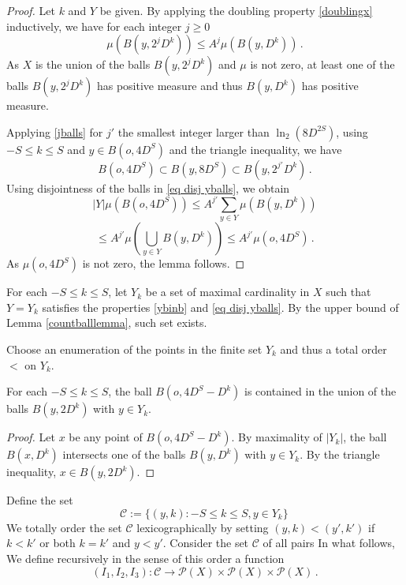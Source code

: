 \begin{proof}
    Let $k$ and $Y$ be given.
    By applying the doubling property \eqref{doublingx} inductively, we have for each integer $j\ge 0$
    \begin{equation}\label{jballs}
        \mu(B(y,2^{j}D^k))\le A^j \mu(B(y,D^k))\, .
    \end{equation}
    As $X$ is the union of the balls $B(y,2^{j}D^k)$ and $\mu$ is not zero, at least one of
    the balls $B(y,2^{j}D^k)$ has positive measure and thus $B(y,D^k)$ has positive measure.

    Applying \eqref{jballs} for $j'$ the smallest integer larger than $\ln_2(8D^{2S})$, using $-S\le k\le S$
    and $y\in B(o,4D^S)$ and the triangle inequality, we have
    \begin{equation}
        B(o, 4D^S) \subset B(y, 8D^S) \subset B(y,2^{j'}D^k) \, .
    \end{equation}
Using disjointness of the balls in \eqref{eq disj yballs}, we obtain
\begin{equation}
|Y|\mu(B(o,4D^S))\le A^{j'}\sum_{y\in Y}\mu(B(y,D^k))
\end{equation}
\begin{equation}
\le
A^{j'}\mu(\bigcup_{y\in Y}B(y,D^k))
\le A^{j'}\mu(o,4D^S)\, .
\end{equation}
As $\mu(o,4D^S)$ is not zero, the lemma follows.
\end{proof}

For each $-S\le k\le S$, let $Y_k$ be a set of
maximal cardinality in $X$ such that $Y=Y_k$ satisfies
the properties \eqref{ybinb} and \eqref{eq disj yballs}.
By the upper bound of Lemma \ref{countballlemma}, such set exists.

Choose an enumeration of the points in the finite set $Y_k$ and thus a total
order  $<$ on $Y_{k}$.

\begin{lemma}\label{ballcover}
    For each $-S\le k\le S$, the ball
    $B(o, 4D^S-D^k)$ is contained
    in the union of the balls $B(y,2D^k)$ with $y\in Y_k$.
\end{lemma}

\begin{proof}
Let $x$ be any point of $B(o, 4D^S-D^k)$.   By maximality of $|Y_k|$, the ball
$B(x,  D^k)$ intersects one of the balls
$B(y,  D^k)$ with $y\in Y_k$. By the triangle
inequality, $x\in B(y,2D^k)$.
\end{proof}

Define the set
\begin{equation}
    \mathcal{C}:= \{(y,k): -S\le k\le S, y\in Y_k\}\,
\end{equation}
We totally order the set $\mathcal{C}$ lexicographically by setting
$(y,k)<(y',k')$ if $k< k'$ or both $k=k'$ and $y<y'$.
Consider the set $\mathcal{C}$ of all pairs
In what follows, We define recursively in the sense of this order a function
\begin{equation}
    (I_1,I_2,I_3): \mathcal{C}\to \mathcal{P}(X)\times \mathcal{P}(X)\times \mathcal{P}(X)\, .
\end{equation}


